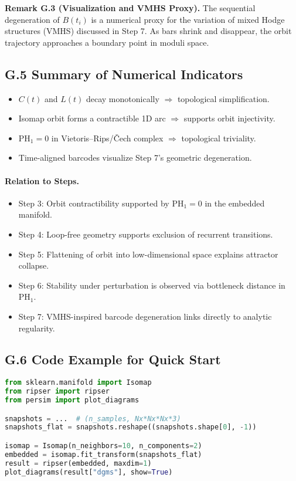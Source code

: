\documentclass[11pt]{article}
\theoremstyle{definition}
\begin{document}
\textbf{Remark G.3 (Visualization and VMHS Proxy).} The sequential degeneration of $B(t_i)$ is a numerical proxy for the variation of mixed Hodge structures (VMHS) discussed in Step 7. As bars shrink and disappear, the orbit trajectory approaches a boundary point in moduli space.

\subsection*{G.5 Summary of Numerical Indicators}
\begin{itemize}
    \item $C(t)$ and $L(t)$ decay monotonically $\Rightarrow$ topological simplification.
    \item Isomap orbit forms a contractible 1D arc $\Rightarrow$ supports orbit injectivity.
    \item $\mathrm{PH}_1 = 0$ in Vietoris--Rips/Čech complex $\Rightarrow$ topological triviality.
    \item Time-aligned barcodes visualize Step 7’s geometric degeneration.
\end{itemize}

\paragraph{Relation to Steps.}
\begin{itemize}
    \item Step 3: Orbit contractibility supported by $\mathrm{PH}_1 = 0$ in the embedded manifold.
    \item Step 4: Loop-free geometry supports exclusion of recurrent transitions.
    \item Step 5: Flattening of orbit into low-dimensional space explains attractor collapse.
    \item Step 6: Stability under perturbation is observed via bottleneck distance in $\mathrm{PH}_1$.
    \item Step 7: VMHS-inspired barcode degeneration links directly to analytic regularity.
\end{itemize}

\subsection*{G.6 Code Example for Quick Start}
\begin{lstlisting}[language=Python]
from sklearn.manifold import Isomap
from ripser import ripser
from persim import plot_diagrams

snapshots = ...  # (n_samples, Nx*Nx*Nx*3)
snapshots_flat = snapshots.reshape((snapshots.shape[0], -1))

isomap = Isomap(n_neighbors=10, n_components=2)
embedded = isomap.fit_transform(snapshots_flat)
result = ripser(embedded, maxdim=1)
plot_diagrams(result["dgms"], show=True)
\end{lstlisting}
\end{document}
